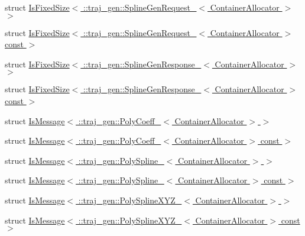 \begin{DoxyCompactItemize}
struct \hyperlink{structros_1_1message__traits_1_1_is_fixed_size_3_01_1_1traj__gen_1_1_spline_gen_request___3_01_container_allocator_01_4_01_4}{Is\+Fixed\+Size$<$ \+::traj\+\_\+gen\+::\+Spline\+Gen\+Request\+\_\+$<$ Container\+Allocator $>$ $>$}
\item 
struct \hyperlink{structros_1_1message__traits_1_1_is_fixed_size_3_01_1_1traj__gen_1_1_spline_gen_request___3_01_c1ecde96b449db99fe3c628d37e48a8e1}{Is\+Fixed\+Size$<$ \+::traj\+\_\+gen\+::\+Spline\+Gen\+Request\+\_\+$<$ Container\+Allocator $>$ const  $>$}
\item 
struct \hyperlink{structros_1_1message__traits_1_1_is_fixed_size_3_01_1_1traj__gen_1_1_spline_gen_response___3_01_container_allocator_01_4_01_4}{Is\+Fixed\+Size$<$ \+::traj\+\_\+gen\+::\+Spline\+Gen\+Response\+\_\+$<$ Container\+Allocator $>$ $>$}
\item 
struct \hyperlink{structros_1_1message__traits_1_1_is_fixed_size_3_01_1_1traj__gen_1_1_spline_gen_response___3_01_2336c611429bfb59739e76b3c3f70a28}{Is\+Fixed\+Size$<$ \+::traj\+\_\+gen\+::\+Spline\+Gen\+Response\+\_\+$<$ Container\+Allocator $>$ const  $>$}
\item 
struct \hyperlink{structros_1_1message__traits_1_1_is_message_3_01_1_1traj__gen_1_1_poly_coeff___3_01_container_allocator_01_4_01_4}{Is\+Message$<$ \+::traj\+\_\+gen\+::\+Poly\+Coeff\+\_\+$<$ Container\+Allocator $>$ $>$}
\item 
struct \hyperlink{structros_1_1message__traits_1_1_is_message_3_01_1_1traj__gen_1_1_poly_coeff___3_01_container_allocator_01_4_01const_01_01_4}{Is\+Message$<$ \+::traj\+\_\+gen\+::\+Poly\+Coeff\+\_\+$<$ Container\+Allocator $>$ const  $>$}
\item 
struct \hyperlink{structros_1_1message__traits_1_1_is_message_3_01_1_1traj__gen_1_1_poly_spline___3_01_container_allocator_01_4_01_4}{Is\+Message$<$ \+::traj\+\_\+gen\+::\+Poly\+Spline\+\_\+$<$ Container\+Allocator $>$ $>$}
\item 
struct \hyperlink{structros_1_1message__traits_1_1_is_message_3_01_1_1traj__gen_1_1_poly_spline___3_01_container_allocator_01_4_01const_01_01_4}{Is\+Message$<$ \+::traj\+\_\+gen\+::\+Poly\+Spline\+\_\+$<$ Container\+Allocator $>$ const  $>$}
\item 
struct \hyperlink{structros_1_1message__traits_1_1_is_message_3_01_1_1traj__gen_1_1_poly_spline_x_y_z___3_01_container_allocator_01_4_01_4}{Is\+Message$<$ \+::traj\+\_\+gen\+::\+Poly\+Spline\+X\+Y\+Z\+\_\+$<$ Container\+Allocator $>$ $>$}
\item 
struct \hyperlink{structros_1_1message__traits_1_1_is_message_3_01_1_1traj__gen_1_1_poly_spline_x_y_z___3_01_conta3ba5a22bb4e2f5978290338256f05796}{Is\+Message$<$ \+::traj\+\_\+gen\+::\+Poly\+Spline\+X\+Y\+Z\+\_\+$<$ Container\+Allocator $>$ const  $>$}

\end{DoxyCompactItemize}
